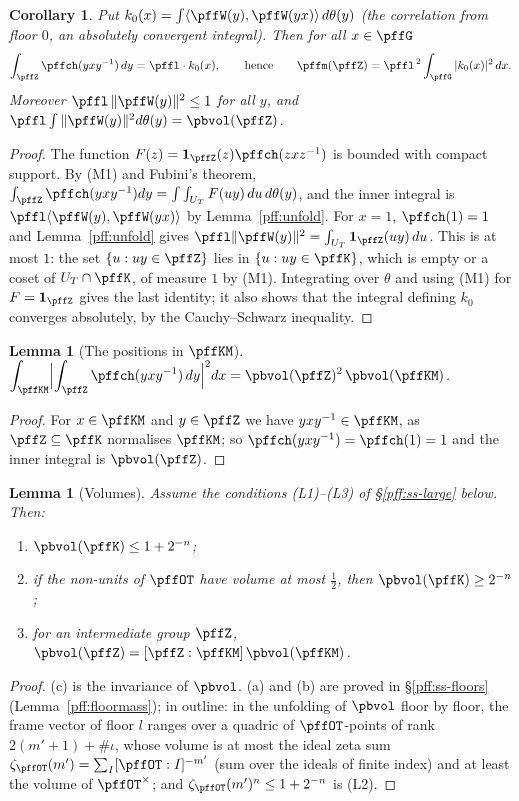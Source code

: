 \documentclass[10pt]{amsart}
\newtheorem{lemma}[theorem]{Lemma}
\newtheorem{corollary}[theorem]{Corollary}
\theoremstyle{definition}
\theoremstyle{remark}
\begin{document}
\begin{corollary}\label{pff:k0}
Put $k_0(x)=\int\langle\pffW(y),\pffW(yx)\rangle\,d\theta(y)$ (the \emph{correlation from floor
$0$}, an absolutely convergent integral). Then for all $x\in\pffG$
\[
\int_{\pffZ}\pffch(yxy^{-1})\,dy=\pffl\cdot k_0(x),\qquad\text{hence}\qquad\pffm(\pffZ)=\pffl^{\,2}
\int_{\pffG}|k_0(x)|^2\,dx .
\]
Moreover $\pffl\,\|\pffW(y)\|^2\le1$ for all $y$, and $\pffl\int\|\pffW(y)\|^2d\theta(y)=
\pbvol(\pffZ)$.
\end{corollary}
\begin{proof}
The function $F(z)=\mathbf 1_{\pffZ}(z)\pffch(zxz^{-1})$ is bounded with compact support. By (M1)
and Fubini's theorem, $\int_{\pffZ}\pffch(yxy^{-1})dy=\int\int_{U_T}F(uy)\,du\,d\theta(y)$, and the
inner integral is $\pffl\langle\pffW(y),\pffW(yx)\rangle$ by Lemma~\ref{pff:unfold}. For $x=1$,
$\pffch(1)=1$ and Lemma~\ref{pff:unfold} gives $\pffl\|\pffW(y)\|^2=\int_{U_T}\mathbf 1_{\pffZ}(uy)\,du$.
This is at most $1$: the set $\{u:uy\in\pffZ\}$ lies in $\{u:uy\in\pffK\}$, which is empty or a coset
of $U_T\cap\pffK$, of measure $1$ by (M1). Integrating over $\theta$ and using (M1) for
$F=\mathbf 1_{\pffZ}$ gives the last identity; it also shows that the integral defining $k_0$
converges absolutely, by the Cauchy--Schwarz inequality.
\end{proof}

\begin{lemma}[The positions in $\pffKM$]\label{pff:inKM}
$\displaystyle\int_{\pffKM}\Bigl|\int_{\pffZ}\pffch(yxy^{-1})\,dy\Bigr|^2dx=\pbvol(\pffZ)^2\,
\pbvol(\pffKM)$.
\end{lemma}
\begin{proof}
For $x\in\pffKM$ and $y\in\pffZ$ we have $yxy^{-1}\in\pffKM$, as $\pffZ\subseteq\pffK$ normalises
$\pffKM$; so $\pffch(yxy^{-1})=\pffch(1)=1$ and the inner integral is $\pbvol(\pffZ)$.
\end{proof}

\begin{lemma}[Volumes]\label{pff:vol}
Assume the conditions \textup{(L1)}--\textup{(L3)} of \S\ref{pff:ss-large} below. Then:
\begin{enumerate}
\item[(a)] $\pbvol(\pffK)\le1+2^{-n}$;
\item[(b)] if the non-units of $\pffOT$ have volume at most $\frac12$, then $\pbvol(\pffK)\ge
2^{-n}$;
\item[(c)] for an intermediate group $\pffZ$, $\pbvol(\pffZ)=[\pffZ:\pffKM]\,\pbvol(\pffKM)$.
\end{enumerate}
\end{lemma}
\begin{proof}
(c) is the invariance of $\pbvol$. (a) and (b) are proved in \S\ref{pff:ss-floors}
(Lemma~\ref{pff:floormass}); in outline: in the unfolding of $\pbvol$ floor by floor, the frame vector of floor
$l$ ranges over a quadric of $\pffOT$-points of rank $2(m'+1)+\#\iota$, whose volume is at most the
ideal zeta sum $\zeta_{\pffOT}(m')=\sum_{I}[\pffOT:I]^{-m'}$ (sum over the ideals of finite index)
and at least the volume of $\pffOT^\times$; and $\zeta_{\pffOT}(m')^n\le1+2^{-n}$ is (L2).
\end{proof}
\end{document}
